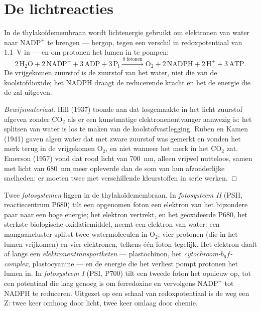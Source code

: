 \section{De lichtreacties}

\begin{proposition}\label{prop:b1:photosynthesis:lightreactions}
In de thylakoïdemembraan wordt lichtenergie gebruikt om elektronen van water naar
$\mathrm{NADP^+}$ te brengen --- bergop, tegen een verschil in redoxpotentiaal van
\qty{1.1}{V} in --- en om protonen het lumen in te pompen:
\[
2\,\mathrm{H_2O} + 2\,\mathrm{NADP^+} + 3\,\mathrm{ADP} + 3\,\mathrm{P_i}
\xrightarrow{\ 8\ \text{fotonen}\ }
\mathrm{O_2} + 2\,\mathrm{NADPH} + 2\,\mathrm{H^+} + 3\,\mathrm{ATP} .
\]
De vrijgekomen zuurstof is de zuurstof van het water, niet die van de
koolstofdioxide; het NADPH draagt de reducerende kracht en het  de energie die
de  zal uitgeven.
\end{proposition}
\begin{proof}[Bewijsmateriaal]
Hill (1937) toonde aan dat losgemaakte  in het licht zuurstof
afgeven zonder $\mathrm{CO_2}$ als er een kunstmatige elektronenontvanger aanwezig
is: het splitsen van water is los te maken van de koolstofvastlegging. Ruben en
Kamen (1941) gaven algen water dat met zware zuurstof was gemerkt en vonden het
merk terug in de vrijgekomen $\mathrm{O_2}$, en niet wanneer het merk in het
$\mathrm{CO_2}$ zat. Emerson (1957) vond dat rood licht van \qty{700}{nm}, alleen
vrijwel nutteloos, samen met licht van \qty{680}{nm} meer opleverde dan de som van
hun afzonderlijke snelheden: er moeten twee  met verschillende
kleurstoffen in serie werken.
\end{proof}

\begin{definition}\label{def:b1:photosynthesis:zscheme}
Twee \emph{fotosystemen} liggen in de thylakoïdemembraan. In \emph{fotosysteem II}
(PSII, reactiecentrum P680) tilt een opgenomen foton een elektron van het
bijzondere paar naar een hoge energie; het elektron vertrekt, en het geoxideerde
P680, het sterkste biologische oxidatiemiddel, neemt een elektron van water: een
mangaancluster splitst twee watermoleculen in $\mathrm{O_2}$, vier protonen (die in
het lumen vrijkomen) en vier elektronen, telkens één foton tegelijk. Het elektron
daalt af langs een \emph{elektronentransportketen} --- plastochinon, het
\emph{cytochroom-$b_6f$-complex}, plastocyanine --- en de energie die het verliest
pompt protonen het lumen in. In \emph{fotosysteem I} (PSI, P700) tilt een tweede
foton het opnieuw op, tot een potentiaal die laag genoeg is om ferredoxine en
vervolgens $\mathrm{NADP^+}$ tot NADPH te reduceren. Uitgezet op een schaal van
redoxpotentiaal is de weg een Z: twee keer omhoog door licht, twee keer omlaag door
chemie.
\end{definition}

